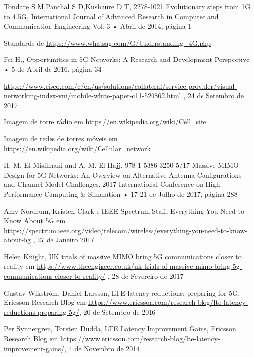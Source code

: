 \documentclass{llncs}
\begin{document}
%
%
\begin{thebibliography}{15}

    Tondare S M,Panchal S D,Kushnure D T,
    2278-1021
    Evolutionary steps from 1G to 4.5G,
    International Journal of Advanced Research in Computer and Communication Engineering Vol. 3
    • Abril de 2014, página 1

    Standards de \url{https://www.whatsag.com/G/Understanding_4G.php}

    Fei H.,
    Opportunities in 5G Networks: A Research and Development Perspective
    • 5 de Abril de 2016, página 34

    \url{https://www.cisco.com/c/en/us/solutions/collateral/service-provider/visual-networking-index-vni/mobile-white-paper-c11-520862.html}
    , 24 de Setembro de 2017

    Imagem de torre rádio em \url{https://en.wikipedia.org/wiki/Cell_site}

    Imagem de redes de torres móveis em \url{https://en.wikipedia.org/wiki/Cellular_network}

    H. M. El Misilmani and A. M. El-Hajj,
    978-1-5386-3250-5/17
    Massive MIMO Design for 5G Networks: An Overview on Alternative Antenna Configurations and Channel Model Challenges,
    2017 International Conference on High Performance Computing \& Simulation
    • 17-21 de Julho de 2017, página 288

    Amy Nordrum, Kristen Clark e IEEE Spectrum Staff,
    Everything You Need to Know About 5G em
    \url{https://spectrum.ieee.org/video/telecom/wireless/everything-you-need-to-know-about-5g}
    , 27 de Janeiro 2017

    Helen Knight,
    UK trials of massive MIMO bring 5G communications closer to reality em
    \url{https://www.theengineer.co.uk/uk-trials-of-massive-mimo-bring-5g-communications-closer-to-reality/}
    , 28 de Fevereiro de 2017

     Gustav Wikström, Daniel Larsson, LTE latency reductions: preparing for 5G, Ericsson Research Blog em \url{https://www.ericsson.com/research-blog/lte-latency-reductions-preparing-5g/}, 20 de Setembro de 2016

     Per Synnergren, Torsten Dudda, LTE Latency Improvement Gains, Ericsson Research Blog em \url{https://www.ericsson.com/research-blog/lte-latency-improvement-gains/}, 4 de Novembro de 2014


\end{thebibliography}
\end{document}
